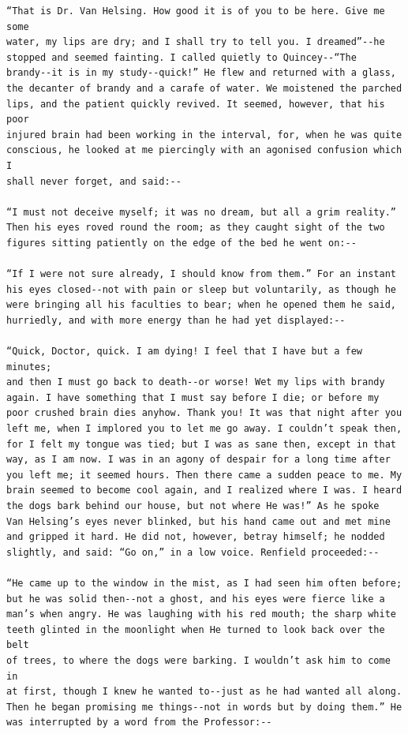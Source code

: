 \documentclass{article}
\begin{document}
\begin{verbatim}
“That is Dr. Van Helsing. How good it is of you to be here. Give me some
water, my lips are dry; and I shall try to tell you. I dreamed”--he
stopped and seemed fainting. I called quietly to Quincey--“The
brandy--it is in my study--quick!” He flew and returned with a glass,
the decanter of brandy and a carafe of water. We moistened the parched
lips, and the patient quickly revived. It seemed, however, that his poor
injured brain had been working in the interval, for, when he was quite
conscious, he looked at me piercingly with an agonised confusion which I
shall never forget, and said:--

“I must not deceive myself; it was no dream, but all a grim reality.”
Then his eyes roved round the room; as they caught sight of the two
figures sitting patiently on the edge of the bed he went on:--

“If I were not sure already, I should know from them.” For an instant
his eyes closed--not with pain or sleep but voluntarily, as though he
were bringing all his faculties to bear; when he opened them he said,
hurriedly, and with more energy than he had yet displayed:--

“Quick, Doctor, quick. I am dying! I feel that I have but a few minutes;
and then I must go back to death--or worse! Wet my lips with brandy
again. I have something that I must say before I die; or before my
poor crushed brain dies anyhow. Thank you! It was that night after you
left me, when I implored you to let me go away. I couldn’t speak then,
for I felt my tongue was tied; but I was as sane then, except in that
way, as I am now. I was in an agony of despair for a long time after
you left me; it seemed hours. Then there came a sudden peace to me. My
brain seemed to become cool again, and I realized where I was. I heard
the dogs bark behind our house, but not where He was!” As he spoke
Van Helsing’s eyes never blinked, but his hand came out and met mine
and gripped it hard. He did not, however, betray himself; he nodded
slightly, and said: “Go on,” in a low voice. Renfield proceeded:--

“He came up to the window in the mist, as I had seen him often before;
but he was solid then--not a ghost, and his eyes were fierce like a
man’s when angry. He was laughing with his red mouth; the sharp white
teeth glinted in the moonlight when He turned to look back over the belt
of trees, to where the dogs were barking. I wouldn’t ask him to come in
at first, though I knew he wanted to--just as he had wanted all along.
Then he began promising me things--not in words but by doing them.” He
was interrupted by a word from the Professor:--


\end{verbatim}
\end{document}
